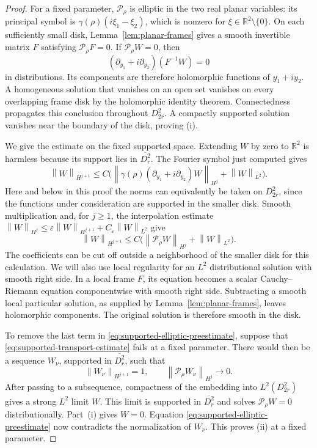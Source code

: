\documentclass[11pt]{article}
\newcommand{\R}{\mathbb R}
\newcommand{\norm}[1]{\left\lVert #1\right\rVert}
\newcommand{\Pcal}{\mathcal P}
\theoremstyle{remark}
\numberwithin{equation}{section}
\begin{document}
\begin{proof}
For a fixed parameter, $\Pcal_\rho$ is elliptic in the two real planar
variables: its principal symbol is
$\gamma(\rho)(i\xi_1-\xi_2)$, which is nonzero for
$\xi\in\R^2\setminus\{0\}$. On each sufficiently small disk,
Lemma~\ref{lem:planar-frames} gives a smooth invertible matrix $F$
satisfying $\Pcal_\rho F=0$. If $\Pcal_\rho W=0$, then
\[
 (\partial_{y_1}+i\partial_{y_2})(F^{-1}W)=0
\]
in distributions. Its components are therefore holomorphic functions
of $y_1+iy_2$. A homogeneous solution that vanishes on an open set
vanishes on every overlapping frame disk by the holomorphic identity
theorem. Connectedness propagates this conclusion throughout
$D_{2r}^2$. A compactly supported solution vanishes near the boundary
of the disk, proving \textup{(i)}.

We give the estimate on the fixed supported space. Extending $W$ by
zero to $\R^2$ is harmless because its support lies in $\overline{D_r^2}$.
The Fourier symbol just computed gives
\[
 \norm{W}_{H^{j+1}}
 \leq C\bigl(
    \norm{\gamma(\rho)(\partial_{y_1}+i\partial_{y_2})W}_{H^j}
       +\norm{W}_{L^2}\bigr).
\]
Here and below in this proof the norms can equivalently be taken on
$D_{2r}^2$, since the functions under consideration are supported in
the smaller disk. Smooth multiplication and, for $j\geq1$, the
interpolation estimate
$\norm{W}_{H^j}\leq\varepsilon\norm{W}_{H^{j+1}}
 +C_\varepsilon\norm{W}_{L^2}$ give
\begin{equation}\label{eq:supported-elliptic-preestimate}
 \norm{W}_{H^{j+1}}
 \leq C\bigl(\norm{\Pcal_\rho W}_{H^j}
                  +\norm{W}_{L^2}\bigr).
\end{equation}
The coefficients can be cut off outside a neighborhood of the smaller
disk for this calculation. We will also use local regularity for an
$L^2$ distributional solution with smooth right side. In a local frame
$F$, its equation becomes a scalar Cauchy--Riemann equation componentwise
with smooth right side. Subtracting a smooth local particular solution,
as supplied by Lemma~\ref{lem:planar-frames}, leaves holomorphic
components. The original solution is therefore smooth in the disk.

To remove the last term in \eqref{eq:supported-elliptic-preestimate},
suppose that \eqref{eq:supported-transport-estimate} fails at a fixed
parameter. There would then be a sequence $W_\nu$, supported in
$\overline{D_r^2}$, such that
\[
 \norm{W_\nu}_{H^{j+1}}=1,
 \qquad
 \norm{\Pcal_\rho W_\nu}_{H^j}\longrightarrow0.
\]
After passing to a subsequence, compactness of the embedding into
$L^2(D_{2r}^2)$ gives a strong $L^2$ limit $W$. This limit is supported
in $\overline{D_r^2}$ and solves $\Pcal_\rho W=0$ distributionally.
Part~\textup{(i)} gives $W=0$. Equation
\eqref{eq:supported-elliptic-preestimate} now contradicts the
normalization of $W_\nu$. This proves \textup{(ii)} at a fixed parameter.


\end{proof}
\end{document}
